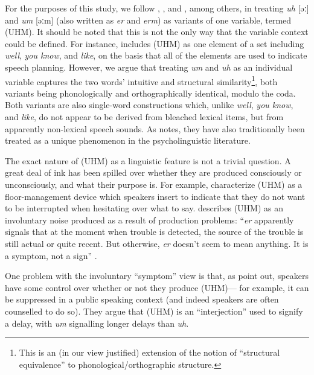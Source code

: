 \documentclass[11pt]{article}
\begin{document}
For the purposes of this study, we follow \textcite{fruehwald2016},
\textcite{wielingetal2016}, and \textcite{tottie2016}, among others, in treating
\emph{uh} [əː] and \emph{um} [əːm] (also written as \emph{er} and \emph{erm}) as
variants of one variable, termed (UHM).
It should be noted that this is not the only way that the variable context could
be defined.
For instance, \textcite{tottie2018} includes (UHM) as one element of a set
including \emph{well}, \emph{you know}, and \emph{like}, on the basis that all
of the elements are used to indicate speech planning.
However, we argue that treating \emph{um} and \emph{uh} as an individual
variable captures the two words' intuitive and structural similarity\footnote{%
    This is an (in our view justified) extension of the notion of ``structural
    equivalence'' \parencite{pichler2010, tagliamontedenis2010} to phonological/orthographic structure.
}, both variants being phonologically and orthographically identical, modulo
the coda.
Both variants are also single-word constructions which, unlike \emph{well},
\emph{you know}, and \emph{like}, do not appear to be derived from bleached
lexical items, but from apparently non-lexical speech sounds.
As \textcite{fruehwald2016} notes, they have also traditionally been treated as
a unique phenomenon in the psycholinguistic literature.

The exact nature of (UHM) as a linguistic feature is not a trivial question.
A great deal of ink has been spilled over whether they are produced consciously
or unconsciously, and what their purpose is.
For example, \textcite[41--42]{maclayosgood1959} characterize (UHM) as a
floor-management device which speakers insert to indicate that they do not want
to be interrupted when hesitating over what to say.
\textcite{levelt1983, levelt1989} describes (UHM) as an involuntary noise
produced as a result of production problems: ``\emph{er} apparently signals that
at the moment when trouble is detected, the source of the trouble is still
actual or quite recent. But otherwise, \emph{er} doesn't seem to mean anything.
It is a symptom, not a sign'' \parencite[484]{levelt1989}.

One problem with the involuntary ``symptom'' view is that, as
\textcite{clarkfoxtree2002} point out, speakers have some control over whether
or not they produce (UHM)---%
for example, it can be suppressed in a public speaking context (and indeed
speakers are often counselled to do so).
They argue that (UHM) is an ``interjection'' used to signify a delay, with
\emph{um} signalling longer delays than \emph{uh}.
\end{document}

